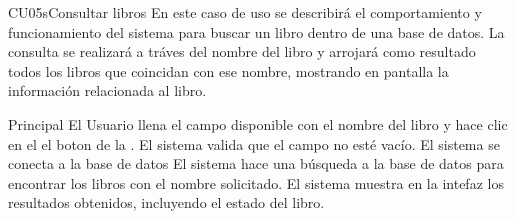 
	\begin{UseCase}{CU05s}{Consultar libros}{
		En este caso de uso se describirá el comportamiento y funcionamiento del sistema para buscar un libro dentro de una base de datos. La consulta se realizará a tráves del nombre del libro y arrojará como resultado todos los libros que coincidan con ese nombre, mostrando en pantalla la información relacionada al libro.
	}
	\end{UseCase}
	\begin{UCtrayectoria}{Principal}
		\UCpaso[\UCactor] El Usuario llena el campo disponible con el nombre del libro y hace clic en el el boton  de la .
		\UCpaso[\UCsist] El sistema valida que el campo no esté vacío. 
		\UCpaso[\UCsist] El sistema se conecta a la base de datos 
		\UCpaso[\UCsist] El sistema hace una búsqueda a la base de datos para encontrar los libros con el nombre solicitado. 
		\UCpaso[\UCsist] El sistema muestra en la intefaz  los resultados obtenidos, incluyendo el estado del libro.
	\end{UCtrayectoria}
